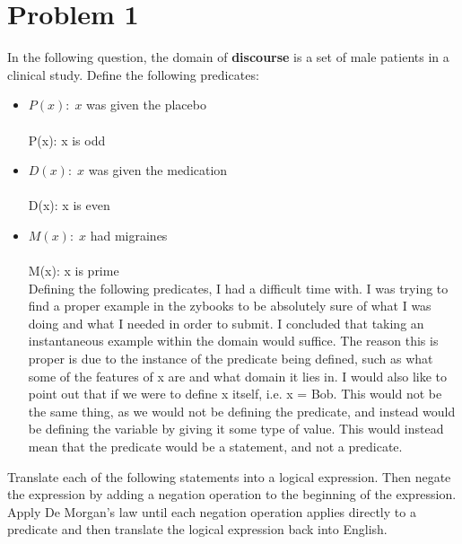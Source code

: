 \section*{Problem 1}

In the following question, the domain of {\bf discourse} is a set of male patients in a clinical study. Define the following predicates:\\
\begin{itemize}
  \item $P(x):\; x$ was given the placebo\\\\ \;P(x): x is odd\\
  \item $D(x):\; x$ was given the medication\\\\ \;D(x): x is even\\
  \item $M(x): \; x$ had migraines\\\\ \;M(x): x is prime\\
  
  \; Defining the following predicates, I had a difficult time with. I was trying to find a proper example in the zybooks to be absolutely sure of what I was doing and what I needed in order to submit. I concluded that taking an instantaneous example within the domain would suffice. The reason this is proper is due to the instance of the predicate being defined, such as what some of the features of x are and what domain it lies in. I would also like to point out that if we were to define x itself, i.e. x = Bob. This would not be the same thing, as we would not be defining the predicate, and instead would be defining the variable by giving it some type of value. This would instead mean that the predicate would be a statement, and not a predicate. \\
\end{itemize}
Translate each of the following statements into a logical expression. Then negate the expression by adding a negation operation to the beginning of the expression. Apply De Morgan's law until each negation operation applies directly to a predicate and then translate the logical expression back into English.\\\\

